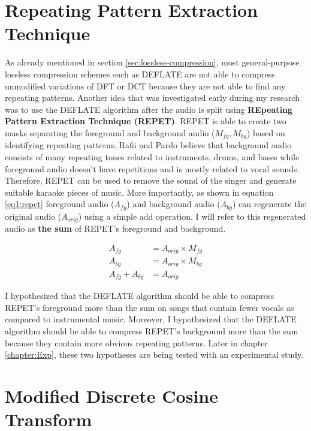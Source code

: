 \section{Repeating Pattern Extraction Technique}
\label{sec:repet}

As already mentioned in section \ref{sec:lossless-compression}, most general-purpose lossless compression schemes such as DEFLATE\cite{Deutsch1996rfc1951} are not able to compress unmodified variations of DFT or DCT because they are not able to find any repeating patterns. Another idea that was investigated early during my research was to use the DEFLATE algorithm after the audio is split using \textbf{REpeating Pattern Extraction Technique (REPET)}\cite{Rafii2013repet}. REPET is able to create two masks separating the foreground and background audio ($M_{fg} ,  M_{bg}$) based on identifying  repeating patterns. Rafii and Pardo believe that background audio consists of many repeating tones related to instruments, drums, and bases while foreground audio doesn't have repetitions and is mostly related to vocal sounds. Therefore, REPET can be used to remove the sound of the singer and generate suitable karaoke pieces of music. More importantly, as shown in equation \ref{eq1:repet} foreground audio ($A_{fg}$) and background audio ($A_{bg}$) can regenerate the original audio ($A_{orig}$) using a simple add operation. I will refer to this regenerated audio as \textbf{the sum} of REPET's foreground and background.

\begin{equation}
\label{eq1:repet}
\begin{aligned} 
A_{fg} &= A_{orig} \times M_{fg} \\
A_{bg} &= A_{orig} \times M_{bg} \\
A_{fg} + A_{bg} &= A_{orig}
\end{aligned}
\end{equation}

I hypothesized that the DEFLATE algorithm should be able to compress REPET's foreground more than the sum on songs that contain fewer vocals as compared to instrumental music. Moreover, I hypothesized that the DEFLATE algorithm should be able to compress REPET's background more than the sum because they contain more obvious repeating patterns. Later in chapter \ref{chapter:Exp}, these two hypotheses are being tested with an experimental study.

\section{Modified Discrete Cosine Transform}
\label{sec:mdct}

